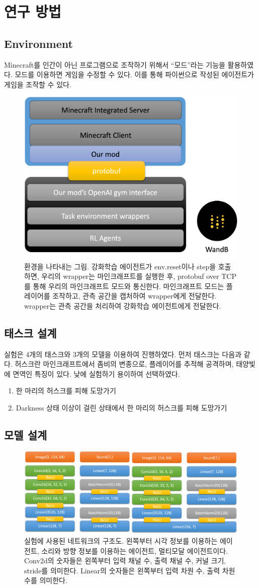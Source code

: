 \documentclass{tudelftposter}
\begin{document}
\section{연구 방법}
\subsection{Environment}
Minecraft를 인간이 아닌 프로그램으로 조작하기 위해서 ``모드''라는 기능을 활용하였다. 모드를 이용하면 게임을 수정할 수 있다. 이를 통해 파이썬으로 작성된 에이전트가 게임을 조작할 수 있다.

\begin{figure}
  \centering
  \includegraphics[width=.3\textwidth]{arch1.png}
  \caption{환경을 나타내는 그림. 강화학습 에이전트가 env.reset이나 step을 호출하면, 우리의 wrapper는 마인크래프트를 실행한 후, protobuf over TCP를 통해 우리의 마인크래프트 모드와 통신한다. 마인크래프트 모드는 플레이어를 조작하고, 관측 공간을 캡처하여 wrapper에게 전달한다. wrapper는 관측 공간을 처리하여 강화학습 에이전트에게 전달한다.}
  \label{fig:test}
\end{figure}


\subsection{태스크 설계}
실험은 4개의 태스크와 3개의 모델을 이용하여 진행하였다. 먼저 태스크는 다음과 같다. 허스크란 마인크래프트에서 좀비의 변종으로, 플레이어를 추적해 공격하며, 태양빛에 면역인 특징이 있다. 낮에 실험하기 용이하여 선택하였다.
\begin{enumerate}
  \item 한 마리의 허스크를 피해 도망가기
  \item Darkness 상태 이상이 걸린 상태에서 한 마리의 허스크를 피해 도망가기
\end{enumerate}

\subsection{모델 설계}
\begin{figure}
  \centering
  \includegraphics[width=.4\textwidth]{models.png}
  \caption{실험에 사용된 네트워크의 구조도. 왼쪽부터 시각 정보를 이용하는 에이전트, 소리와 방향 정보를 이용하는 에이전트, 멀티모달 에이전트이다. Conv2d의 숫자들은 왼쪽부터 입력 채널 수, 출력 채널 수, 커널 크기, stride를 의미한다. Linear의 숫자들은 왼쪽부터 입력 차원 수, 출력 차원 수를 의미한다.}
  \label{fig:models}
\end{figure}
\end{document}
